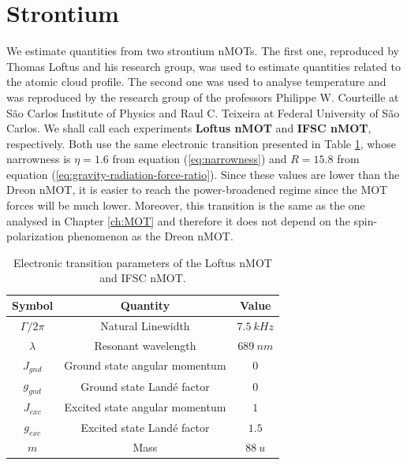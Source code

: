 %
\section{Strontium}
\label{eq:strontium}
%

We estimate quantities from two strontium nMOTs. The first one, reproduced by Thomas Loftus \cite{loftus2004narrow} and his research group, was used to estimate quantities related to the atomic cloud profile. The second one was used to analyse temperature and was reproduced by the research group of the professors Philippe W. Courteille at São Carlos Institute of Physics and Raul C. Teixeira at Federal University of São Carlos. We shall call each experiments \textbf{Loftus nMOT} and \textbf{IFSC nMOT}, respectively. Both use the same electronic transition presented in Table \ref{tab:electronic-transition-St-loftus}, whose narrowness is $ \eta = 1.6 $ from equation (\ref{eq:narrowness}) and $ R = 15.8 $ from equation (\ref{eq:gravity-radiation-force-ratio}). Since these values are lower than the Dreon nMOT, it is easier to reach the power-broadened regime since the MOT forces will be much lower. Moreover, this transition is the same as the one analysed in Chapter \ref{ch:MOT} and therefore it does not depend on the spin-polarization phenomenon as the Dreon nMOT.

\begin{table}[ht!]
    \centering
    \begin{tabular}{|c|c|c|}
        \hline
        \textbf{Symbol} & \textbf{Quantity} & \textbf{Value} \\ \hline
        $ \Gamma / 2\pi $ & Natural Linewidth & $ 7.5\ kHz $ \\
        $ \lambda $ & Resonant wavelength & $ 689\ nm $ \\
        $ J_{gnd} $ & Ground state angular momentum & $ 0 $ \\
        $ g_{gnd} $ & Ground state Landé factor & $ 0 $ \\
        $ J_{exc} $ & Excited state angular momentum & $ 1 $ \\
        $ g_{exc} $ & Excited state Landé factor & $ 1.5 $ \\
        $ m $ & Mass & $ 88\ u $ \\
        \hline
    \end{tabular}
    \caption{Electronic transition parameters of the Loftus nMOT and IFSC nMOT.}
    \label{tab:electronic-transition-St-loftus}
\end{table}

